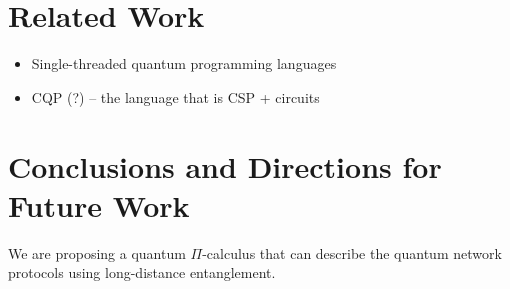 \documentclass[a4paper,UKenglish,cleveref, autoref, thm-restate]{lipics-v2021}
\begin{document}









\section{Related Work} \label{sec:related-work}

\begin{itemize}
    \item Single-threaded quantum programming languages
    \item CQP (?) -- the language that is CSP + circuits
\end{itemize}

\section{Conclusions and Directions for Future Work} \label{sec:conclusions}

We are proposing a quantum $\Pi$-calculus that can describe the quantum network protocols using long-distance entanglement. 



\end{document}
